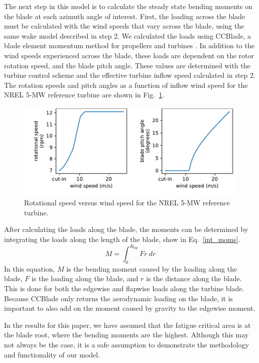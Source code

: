 \documentclass[11pt,letterpaper]{article}
\begin{document}
The next step in this model is to calculate the steady state bending moments on the blade at each azimuth angle of interest. First, the loading across the blade must be calculated with the wind speeds that vary across the blade, using the same wake model described in step 2. We calculated the loads using CCBlade, a blade element momentum method for propellers and turbines \cite{Ning2020}. In addition to the wind speeds experienced across the blade, these loads are dependent on the rotor rotation speed, and the blade pitch angle. These values are determined with the turbine control scheme and the effective turbine inflow speed calculated in step 2. The rotation speeds and pitch angles as a function of inflow wind speed for the NREL 5-MW reference turbine are shown in Fig.~\ref{omegas}. 
% 
\begin{figure}
    \centering
    \includegraphics[]{images/omegas.pdf}
    \caption{Rotational speed versus wind speed for the NREL 5-MW reference turbine.}
    \label{omegas}
\end{figure}
% 
After calculating the loads along the blade, the moments can be determined by integrating the loads along the length of the blade, show in Eq.~\ref{int_moms}. 
%
\begin{equation}
    \label{int_moms}
    M = \int_0^{R_{\text{tip}}} Fr~dr
\end{equation}
%
In this equation, $M$ is the bending moment caused by the loading along the blade, $F$ is the loading along the blade, and $r$ is the distance along the blade.
This is done for both the edgewise and flapwise loads along the turbine blade. Because CCBlade only returns the aerodynamic loading on the blade, it is important to also add on the moment caused by gravity to the edgewise moment.

In the results for this paper, we have assumed that the fatigue critical area is at the blade root, where the bending moments are the highest. Although this may not always be the case, it is a safe assumption to demonstrate the methodology and functionality of our model.
\end{document}
